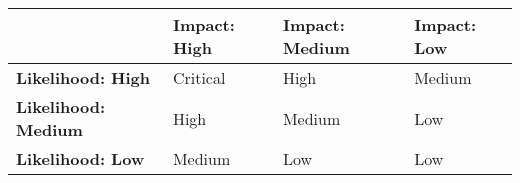 \begin{table}[ht]
    \centering
    \begin{tabular}{|l|l|l|l|}
    \hline
                  & \textbf{Impact: High} & \textbf{Impact: Medium} & \textbf{Impact: Low} \\
    \hline
    \textbf{Likelihood: High}    & Critical       & High            & Medium         \\
    \hline
    \textbf{Likelihood: Medium}  & High           & Medium          & Low            \\
    \hline
    \textbf{Likelihood: Low}     & Medium         & Low             & Low            \\
    \hline
    \end{tabular}
\end{table}
